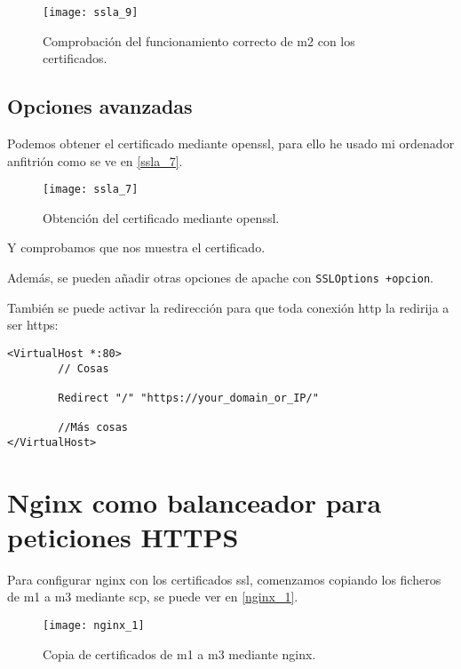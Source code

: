 \begin{figure}[h!]
\begin{center}
\caption{Comprobación del funcionamiento correcto de m2 con los certificados.}
\label{ssla_9}
\texttt{[image: ssla\_9]}
\end{center}
\end{figure}


\section{Opciones avanzadas}

Podemos obtener el certificado mediante openssl, para ello he usado mi ordenador anfitrión como se ve en \eqref{ssla_7}.

\begin{figure}[h!]
\begin{center}
\caption{Obtención del certificado mediante openssl.}
\label{ssla_7}
\texttt{[image: ssla\_7]}
\end{center}
\end{figure}

Y comprobamos que nos muestra el certificado.

Además, se pueden añadir otras opciones de apache con \verb|SSLOptions +opcion|.

También se puede activar la redirección para que toda conexión http la redirija a ser https:

\begin{verbatim}
<VirtualHost *:80>
        // Cosas

        Redirect "/" "https://your_domain_or_IP/"

        //Más cosas
</VirtualHost>
\end{verbatim}

\chapter{Nginx como balanceador para peticiones HTTPS}

Para configurar nginx con los certificados ssl, comenzamos copiando los ficheros de m1 a m3 mediante scp, se puede ver en \eqref{nginx_1}.

\begin{figure}[h!]
\begin{center}
\caption{Copia de certificados de m1 a m3 mediante nginx.}
\label{nginx_1}
\texttt{[image: nginx\_1]}
\end{center}
\end{figure}

